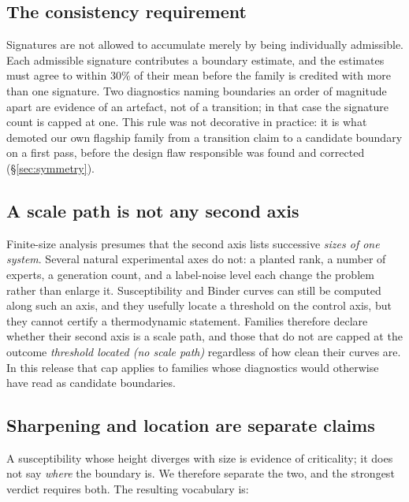 \subsection{The consistency requirement}

Signatures are not allowed to accumulate merely by being individually
admissible. Each admissible signature contributes a boundary estimate, and the
estimates must agree to within $30\%$ of their mean before the family is
credited with more than one signature. Two diagnostics naming boundaries an
order of magnitude apart are evidence of an artefact, not of a transition; in
that case the signature count is capped at one. This rule was not decorative in
practice: it is what demoted our own flagship family from a transition claim to
a candidate boundary on a first pass, before the design flaw responsible was
found and corrected (\S\ref{sec:symmetry}).

\subsection{A scale path is not any second axis}

Finite-size analysis presumes that the second axis lists successive \emph{sizes
of one system}. Several natural experimental axes do not: a planted rank, a
number of experts, a generation count, and a label-noise level each change the
problem rather than enlarge it. Susceptibility and Binder curves can still be
computed along such an axis, and they usefully locate a threshold on the control
axis, but they cannot certify a thermodynamic statement. Families therefore
declare whether their second axis is a scale path, and those that do not are
capped at the outcome \emph{threshold located (no scale path)} regardless of how
clean their curves are. In this release that cap applies to
\AtlasCountThresholdLocatedNoScalePath{} families whose diagnostics would
otherwise have read as candidate boundaries.

\subsection{Sharpening and location are separate claims}

A susceptibility whose height diverges with size is evidence of criticality; it
does not say \emph{where} the boundary is. We therefore separate the two, and
the strongest verdict requires both. The resulting vocabulary is:

